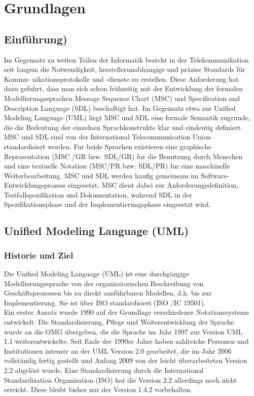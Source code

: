 

\chapter{Grundlagen}

\section{Einführung)}
Im Gegensatz zu weiten Teilen der Informatik besteht in der Telekommunikation seit langem die Notwendigkeit,
herstellerunabhangige und präzise Standards für Kommu- nikationsprotokolle und -dienste zu erstellen. Diese Anforderung hat dazu gefuhrt, dass man sich schon frühzeitig mit der Entwicklung der formalen Modellierungssprachen Message Sequence Chart (MSC) und Specification and Description Language (SDL) beschaftigt hat. Im Gegensatz etwa zur Unified Modeling Language (UML) liegt MSC
und SDL eine formale Semantik zugrunde, die die Bedeutung der einzelnen Sprachkonstrukte klar und eindeutig
definiert.\\
MSC und SDL sind von der International Telecommunication Union standardisiert worden. Fur beide Sprachen existieren eine graphische Reprasentation (MSC /GR bzw. SDL/GR) fur die Benutzung durch Menschen und eine textuelle Notation (MSC/PR bzw. SDL/PR) fur eine maschinelle Weiterbearbeitung. MSC und SDL werden haufig gemeinsam im Software-Entwicklungsprozess eingesetzt. MSC dient dabei zur Anforderungsdefinition, Testfallspezifikation und Dokumentation, wahrend SDL in der Spezifikationsphase und der Implementierungsphase eingesetzt wird.

\section{Unified Modeling Language (UML)}

\subsection{Historie und Ziel}
Die Unified Modeling Language (UML) ist eine durchgängige Modellierungssprache von der
organisatorischen Beschreibung von Geschäftsprozessen bis zu direkt ausführbaren Modellen,
d.h. bis zur Implementierung. Sie ist über ISO standardisiert (ISO /IC 19501).\\
Ein erster Ansatz wurde 1990 auf der Grundlage verschiedener Notationssysteme entwickelt.
Die Standardisierung, Pflege und Weiterentwicklung der Sprache wurde an die OMG
übergeben, die die Sprache im Jahr 1997 zur Version UML 1.1 weiterentwickelte. Seit Ende der
1990er Jahre haben zahlreiche Personen und Institutionen intensiv an der UML Version 2.0
gearbeitet, die im Jahr 2006 vollständig fertig gestellt und Anfang 2009 von der leicht
überarbeiteten Version 2.2 abgelöst wurde. Eine Standardisierung durch die International
Standardization Organization (ISO) hat die Version 2.2 allerdings noch nicht erreicht. Diese
bleibt bisher nur der Version 1.4.2 vorbehalten.

